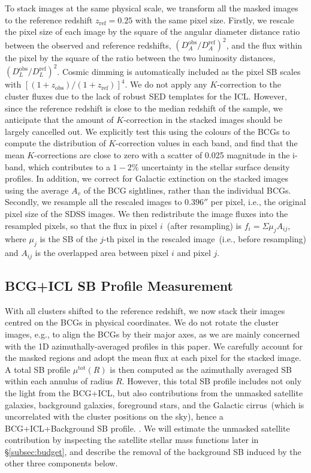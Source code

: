 \documentclass[fleqn,usenatbib]{mnras}
\begin{document}
To stack images at the same physical scale, we transform all the masked
images to the reference redshift $z_{\mathrm{ref}}{=}0.25$ with the same
pixel size. Firstly, we rescale the pixel size of each image by the square
of the angular diameter distance ratio between the observed and reference
redshifts, $(D_A^{\mathrm{obs}}/D_A^{\mathrm{ref}})^2$, and the flux within
the pixel by the square of the ratio between the two luminosity distances,
$(D_L^{\mathrm{obs}}/D_L^{\mathrm{ref}})^{2}$. Cosmic dimming is
automatically included as the pixel SB scales with
$[(1+z_{\mathrm{obs}})/(1+z_{\mathrm{ref}})]^4$. We do not apply any
$K$-correction to the cluster fluxes due to the lack of robust SED
templates for the ICL. However, since the reference redshift is close to
the median redshift of the sample, we anticipate that the amount of
$K$-correction in the stacked images should be largely cancelled out.
We explicitly test this using the colours of the BCGs to compute the
distribution of $K$-correction values in each band, and find that the mean
$K$-corrections are close to zero with a scatter of 0.025 magnitude in the
i-band, which contributes to a $1-2\%$ uncertainty in the stellar
surface density profiles. In addition, we correct for Galactic extinction
on the stacked images using the average $A_v$ of the BCG sightlines, rather
than the individual BCGs. Secondly, we resample all the rescaled images to
$0.396''$ per pixel, i.e., the original pixel size of the SDSS images.  We
then redistribute the image fluxes into the resampled pixels, so that the
flux in pixel $i$~(after resampling) is $f_i{=}\Sigma \mu_j A_{ij}$, where
$\mu_j$ is the SB of the $j$-th pixel in the rescaled image~(i.e., before
resampling) and $A_{ij}$ is the overlapped area between pixel $i$ and pixel
$j$.


\subsection{BCG+ICL SB Profile Measurement}
\label{subsec:sbprofile}

With all clusters shifted to the reference redshift, we now stack their
images centred on the BCGs in physical coordinates. We do not rotate the
cluster images, e.g., to align the BCGs by their major axes, as we are
mainly concerned with the 1D azimuthally-averaged profiles in this paper.
We carefully account for the masked regions and adopt the mean flux at each
pixel for the stacked image. A total SB profile $\mu^{\mathrm{tot}}(R)$ is
then computed as the azimuthally averaged SB within each annulus of radius
$R$. However, this total SB profile includes not only the light from the
BCG+ICL, but also contributions from the unmasked satellite galaxies,
background galaxies, foreground stars, and the Galactic cirrus~(which is
uncorrelated with the cluster positions on the sky), hence a
BCG+ICL+Background SB profile.
. We will estimate the unmasked satellite contribution by inspecting
the satellite stellar mass functions later in \S\ref{subsec:budget}, and
describe the removal of the background SB induced by the other three
components below.
\end{document}
